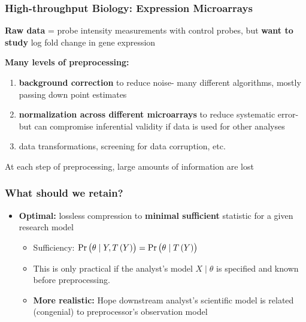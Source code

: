 \documentclass[10pt, compress]{beamer}
\begin{document}
\begin{frame}[fragile]
    \frametitle{High-throughput Biology: Expression Microarrays}
    
    \textbf{Raw data} = probe intensity measurements with control probes, but \textbf{want to study} log fold change in gene expression
    
    \textbf{Many levels of preprocessing:} 

    \begin{enumerate} [<+->]
    \item \textbf{background correction} to reduce noise- many different algorithms, mostly passing down point estimates
    \vspace*{5mm}
    \item \textbf{normalization across different microarrays} to reduce systematic error- but can compromise inferential validity if data is used for other analyses
    \vspace*{5mm}
    \item data transformations, screening for data corruption, etc.
    \end{enumerate}
    
    At each step of preprocessing, large amounts of information are lost

\end{frame}

\begin{frame}[fragile]
    \frametitle{What should we retain?}
    \begin{itemize}
        \item \textbf{Optimal:} lossless compression to \textbf{minimal sufficient} statistic for a given research model
            \begin{itemize}
                \item Sufficiency: $\Pr\del{\theta \mid Y,T\del{Y}}=\Pr\del{\theta \mid T\del{Y}}$
                \item This is only practical if the analyst's model $X \mid \theta$ is specified and known before preprocessing.
                \item \textbf{More realistic:} Hope downstream analyst's scientific model is related (congenial) to preprocessor's observation model
            \end{itemize}
    \end{itemize}
\end{frame}
\end{document}
